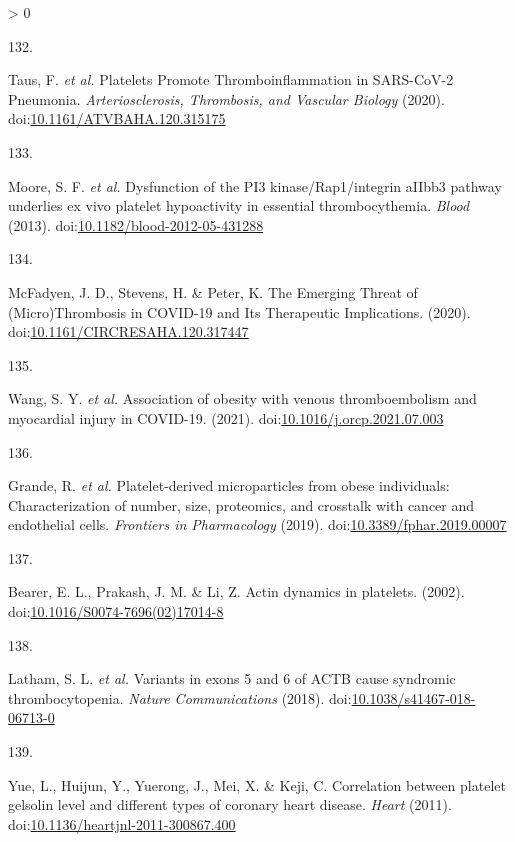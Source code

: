 \documentclass[11pt,twoside]{bristolthesis}
\newlength{\cslhangindent}
\newlength{\csllabelwidth}
\newenvironment{CSLReferences}[2] %
 {%
  \setlength{\parindent}{0pt}
  \ifodd #1 \everypar{\setlength{\hangindent}{\cslhangindent}}\ignorespaces\fi
  \ifnum #2 > 0
  \setlength{\parskip}{#2\baselineskip}
  \fi
 }%
 {}
\newcommand{\CSLLeftMargin}[1]{\parbox[t]{\csllabelwidth}{#1}}
\newcommand{\CSLRightInline}[1]{\parbox[t]{\linewidth - \csllabelwidth}{#1}\break}
\begin{document}
\begin{CSLReferences}{0}{0}
\leavevmode\hypertarget{ref-Taus2020}{}%
\CSLLeftMargin{132. }
\CSLRightInline{Taus, F. \emph{et al.} {Platelets Promote Thromboinflammation in SARS-CoV-2 Pneumonia}. \emph{Arteriosclerosis, Thrombosis, and Vascular Biology} (2020). doi:\href{https://doi.org/10.1161/ATVBAHA.120.315175}{10.1161/ATVBAHA.120.315175}}

\leavevmode\hypertarget{ref-Moore2013}{}%
\CSLLeftMargin{133. }
\CSLRightInline{Moore, S. F. \emph{et al.} {Dysfunction of the PI3 kinase/Rap1/integrin aIIbb3 pathway underlies ex vivo platelet hypoactivity in essential thrombocythemia}. \emph{Blood} (2013). doi:\href{https://doi.org/10.1182/blood-2012-05-431288}{10.1182/blood-2012-05-431288}}

\leavevmode\hypertarget{ref-McFadyen2020}{}%
\CSLLeftMargin{134. }
\CSLRightInline{McFadyen, J. D., Stevens, H. \& Peter, K. {The Emerging Threat of (Micro)Thrombosis in COVID-19 and Its Therapeutic Implications}. (2020). doi:\href{https://doi.org/10.1161/CIRCRESAHA.120.317447}{10.1161/CIRCRESAHA.120.317447}}

\leavevmode\hypertarget{ref-Wang2021}{}%
\CSLLeftMargin{135. }
\CSLRightInline{Wang, S. Y. \emph{et al.} {Association of obesity with venous thromboembolism and myocardial injury in COVID-19}. (2021). doi:\href{https://doi.org/10.1016/j.orcp.2021.07.003}{10.1016/j.orcp.2021.07.003}}

\leavevmode\hypertarget{ref-Grande2019}{}%
\CSLLeftMargin{136. }
\CSLRightInline{Grande, R. \emph{et al.} {Platelet-derived microparticles from obese individuals: Characterization of number, size, proteomics, and crosstalk with cancer and endothelial cells}. \emph{Frontiers in Pharmacology} (2019). doi:\href{https://doi.org/10.3389/fphar.2019.00007}{10.3389/fphar.2019.00007}}

\leavevmode\hypertarget{ref-Bearer2002}{}%
\CSLLeftMargin{137. }
\CSLRightInline{Bearer, E. L., Prakash, J. M. \& Li, Z. {Actin dynamics in platelets}. (2002). doi:\href{https://doi.org/10.1016/S0074-7696(02)17014-8}{10.1016/S0074-7696(02)17014-8}}

\leavevmode\hypertarget{ref-Latham2018}{}%
\CSLLeftMargin{138. }
\CSLRightInline{Latham, S. L. \emph{et al.} {Variants in exons 5 and 6 of ACTB cause syndromic thrombocytopenia}. \emph{Nature Communications} (2018). doi:\href{https://doi.org/10.1038/s41467-018-06713-0}{10.1038/s41467-018-06713-0}}

\leavevmode\hypertarget{ref-Yue2011}{}%
\CSLLeftMargin{139. }
\CSLRightInline{Yue, L., Huijun, Y., Yuerong, J., Mei, X. \& Keji, C. {Correlation between platelet gelsolin level and different types of coronary heart disease}. \emph{Heart} (2011). doi:\href{https://doi.org/10.1136/heartjnl-2011-300867.400}{10.1136/heartjnl-2011-300867.400}}


\end{CSLReferences}
\end{document}
